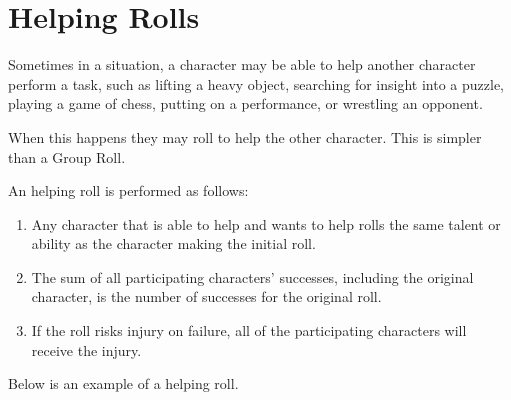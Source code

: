 \section{Helping Rolls}

Sometimes in a situation, a character may be able to help another character perform a task, such as lifting a heavy object, searching for insight into a puzzle, playing a game of chess, putting on a performance, or wrestling an opponent.

When this happens they may roll to help the other character. This is simpler than a Group Roll.

An helping roll is performed as follows:

\begin{enumerate}
	\item Any character that is able to help and wants to help rolls the same talent or ability as the character making the initial roll.
	\item The sum of all participating characters' successes, including the original character, is the number of successes for the original roll.
	\item If the roll risks injury on failure, all of the participating characters will receive the injury.
\end{enumerate}

Below is an example of a helping roll.

\begin{GRPquicknote}
\GRPrfooter{}
\GRPrfooter{}
\end{GRPquicknote}

